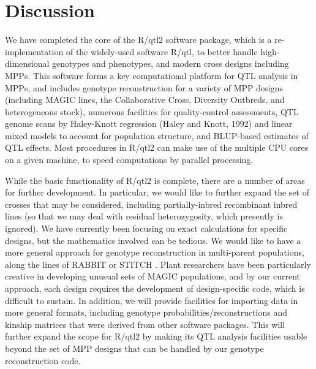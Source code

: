 \documentclass[12pt,letterpaper]{article}
\begin{document}
\clearpage
\section*{Discussion}

We have completed the core of the R/qtl2 software package,
which is a re-implementation of the widely-used software R/qtl,
to better handle high-dimensional genotypes and phenotypes,
and modern cross designs including MPPs.
This software forms a key computational platform for QTL analysis in
MPPs, and includes genotype reconstruction for a variety of MPP designs
(including MAGIC lines, the Collaborative Cross, Diversity Outbreds,
and heterogeneous stock), numerous facilities for quality-control assessments,
QTL genome scans by Haley-Knott regression (Haley and Knott, 1992)
and linear mixed models to account for population structure,
and BLUP-based estimates of QTL effects. Most procedures in
R/qtl2 can make use of the multiple CPU cores on a given machine,
to speed computations by parallel processing.


While the basic functionality of R/qtl2 is complete, there are a
number of areas for further development. In particular, we would like
to further expand the set of crosses that may be considered, including
partially-inbred recombinant inbred lines (so that we may deal with
residual heterozygosity, which presently is ignored). We have currently
been focusing on exact calculations for specific designs, but the
mathematics involved can be tedious. We would like to have a more
general approach for genotype reconstruction in multi-parent
populations, along the lines of RABBIT \citep{zheng2015} or STITCH
\citep{davies2016}. Plant researchers have been particularly creative
in developing unusual sets of MAGIC populations, and by our current
approach, each design requires the development of design-specific
code, which is difficult to sustain.
In addition, we will provide facilities for importing data in more general formats,
including genotype probabilities/reconstructions and kinship matrices that were
derived from other software packages. This will further expand the scope for
R/qtl2 by making its QTL analysis facilities usable beyond the set of MPP
designs that can be handled by our genotype reconstruction code.
\end{document}

